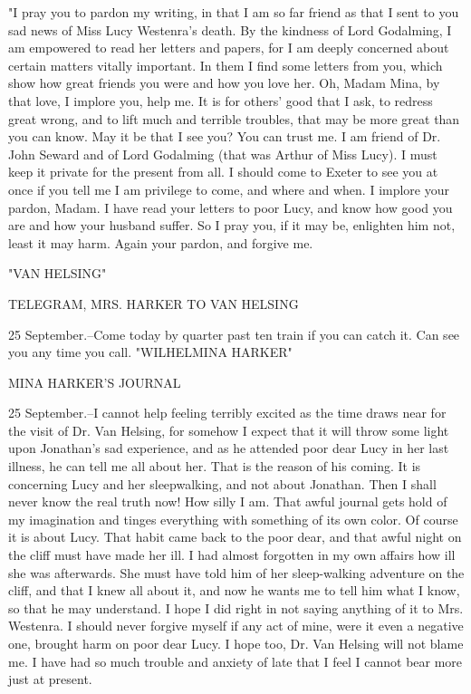 "I pray you to pardon my writing, in that I am so far friend as that I sent to you sad news of Miss Lucy Westenra's death. By the kindness of Lord Godalming, I am empowered to read her letters and papers, for I am deeply concerned about certain matters vitally important. In them I find some letters from you, which show how great friends you were and how you love her. Oh, Madam Mina, by that love, I implore you, help me. It is for others' good that I ask, to redress great wrong, and to lift much and terrible troubles, that may be more great than you can know. May it be that I see you? You can trust me. I am friend of Dr. John Seward and of Lord Godalming (that was Arthur of Miss Lucy). I must keep it private for the present from all. I should come to Exeter to see you at once if you tell me I am privilege to come, and where and when. I implore your pardon, Madam. I have read your letters to poor Lucy, and know how good you are and how your husband suffer. So I pray you, if it may be, enlighten him not, least it may harm. Again your pardon, and forgive me. 

"VAN HELSING" 

TELEGRAM, MRS. HARKER TO VAN HELSING 

25 September.--Come today by quarter past ten train if you can catch it. Can see you any time you call. "WILHELMINA HARKER" 

MINA HARKER'S JOURNAL 

25 September.--I cannot help feeling terribly excited as the time draws near for the visit of Dr. Van Helsing, for somehow I expect that it will throw some light upon Jonathan's sad experience, and as he attended poor dear Lucy in her last illness, he can tell me all about her. That is the reason of his coming. It is concerning Lucy and her sleepwalking, and not about Jonathan. Then I shall never know the real truth now! How silly I am. That awful journal gets hold of my imagination and tinges everything with something of its own color. Of course it is about Lucy. That habit came back to the poor dear, and that awful night on the cliff must have made her ill. I had almost forgotten in my own affairs how ill she was afterwards. She must have told him of her sleep-walking adventure on the cliff, and that I knew all about it, and now he wants me to tell him what I know, so that he may understand. I hope I did right in not saying anything of it to Mrs. Westenra. I should never forgive myself if any act of mine, were it even a negative one, brought harm on poor dear Lucy. I hope too, Dr. Van Helsing will not blame me. I have had so much trouble and anxiety of late that I feel I cannot bear more just at present. 

